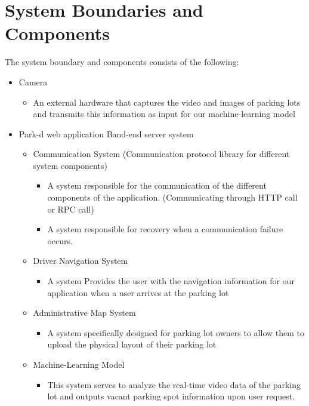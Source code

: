 \documentclass[12pt,letterpaper]{article}
\begin{document}
\section{System Boundaries and Components}
The system boundary and components consists of the following:
\begin{itemize}
    \item Camera
    \begin{itemize}
        \item An external hardware that captures the video and images of parking
        lots and transmits this information as input for our machine-learning
        model
    \end{itemize}
    \item Park-d web application Band-end server system
    \begin{itemize}
        \item Communication System (Communication protocol library for different
        system components)
        \begin{itemize}
            \item A system responsible for the communication of the different
            components of the application. (Communicating through HTTP call or
            RPC call)
            \item A system responsible for recovery when a communication failure
            occurs.
    \end{itemize}
    \item Driver Navigation System
    \begin{itemize}
        \item A system Provides the user with the navigation information for our
        application when a user arrives at the parking lot
    \end{itemize}
    \item Administrative Map System
    \begin{itemize}
        \item A system specifically designed for parking lot owners to allow
        them to upload the physical layout of their parking lot
    \end{itemize}
    \item Machine-Learning Model
    \begin{itemize}
        \item This system serves to analyze the real-time video data of the
        parking lot and outputs vacant parking spot information upon user
        request.
    \end{itemize}

\end{itemize}
\end{itemize}
\end{document}
